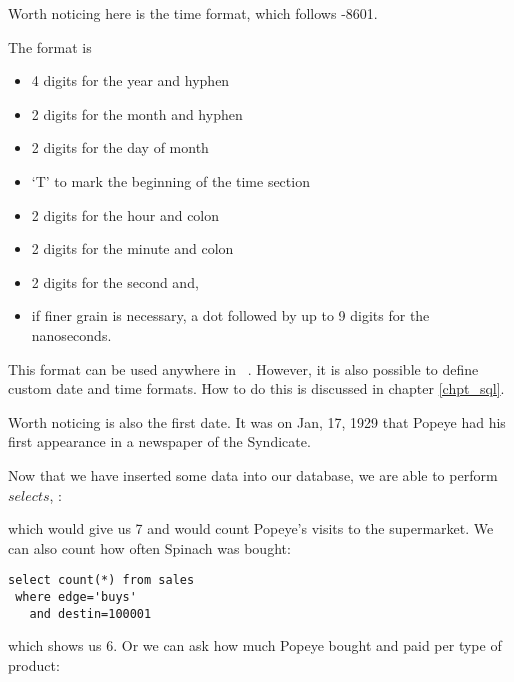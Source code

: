 \begin{minipage}{\textwidth}
Worth noticing here is the time format,
which follows -8601.

The format is
\begin{itemize}
\item 4 digits for the year and hyphen
\item 2 digits for the month and hyphen
\item 2 digits for the day of month
\item `T' to mark the beginning of the time section
\item 2 digits for the hour and colon
\item 2 digits for the minute and colon
\item 2 digits for the second and,
\item if finer grain is necessary,
a dot followed by up to 9 digits
for the nanoseconds.
\end{itemize}
\end{minipage}

This format can be used anywhere in \nowdb\ \sql.
However, it is also possible to define custom
date and time formats. How to do this is discussed
in chapter \ref{chpt_sql}. 

Worth noticing is also the first date.
It was on Jan, 17, 1929 that Popeye had his first
appearance in a newspaper of the 
Syndicate.

Now that we have inserted some data
into our database, we are able to perform $selects$, \eg:


which would give us 7 and would count Popeye's visits to the supermarket.
We can also count how often Spinach was bought:

\begin{sqlcode}
\begin{lstlisting}
select count(*) from sales
 where edge='buys'
   and destin=100001
\end{lstlisting}
\end{sqlcode}

which shows us 6.
Or we can ask how much Popeye bought and paid per type of product:


